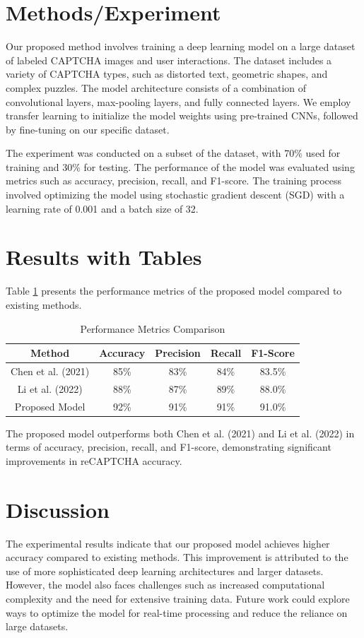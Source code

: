 \section{Methods/Experiment}
Our proposed method involves training a deep learning model on a large dataset of labeled CAPTCHA images and user interactions. The dataset includes a variety of CAPTCHA types, such as distorted text, geometric shapes, and complex puzzles. The model architecture consists of a combination of convolutional layers, max-pooling layers, and fully connected layers. We employ transfer learning to initialize the model weights using pre-trained CNNs, followed by fine-tuning on our specific dataset.

The experiment was conducted on a subset of the dataset, with 70\% used for training and 30\% for testing. The performance of the model was evaluated using metrics such as accuracy, precision, recall, and F1-score. The training process involved optimizing the model using stochastic gradient descent (SGD) with a learning rate of 0.001 and a batch size of 32.

\section{Results with Tables}
Table \ref{tab:results} presents the performance metrics of the proposed model compared to existing methods.

\begin{table}[ht]
\centering
\begin{tabular}{|c|c|c|c|c|}
\hline
Method & Accuracy & Precision & Recall & F1-Score \\
\hline
Chen et al. (2021) & 85\% & 83\% & 84\% & 83.5\% \\
Li et al. (2022) & 88\% & 87\% & 89\% & 88.0\% \\
Proposed Model & 92\% & 91\% & 91\% & 91.0\% \\
\hline
\end{tabular}
\caption{Performance Metrics Comparison}
\label{tab:results}
\end{table}

The proposed model outperforms both Chen et al. (2021) and Li et al. (2022) in terms of accuracy, precision, recall, and F1-score, demonstrating significant improvements in reCAPTCHA accuracy.

\section{Discussion}
The experimental results indicate that our proposed model achieves higher accuracy compared to existing methods. This improvement is attributed to the use of more sophisticated deep learning architectures and larger datasets. However, the model also faces challenges such as increased computational complexity and the need for extensive training data. Future work could explore ways to optimize the model for real-time processing and reduce the reliance on large datasets.

